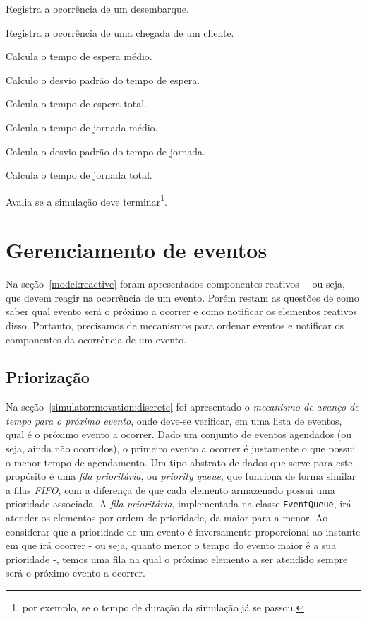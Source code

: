 \begin{description}
    \begin{description}[leftmargin=!,labelwidth=\widthof{\bfseries destinationFloor}]
      \item[\texttt{logDropOff}] Registra a ocorrência de um desembarque.
      \item[\texttt{logTrip}] Registra a ocorrência de uma chegada de um cliente.
      \item[\texttt{getAvgWT}] Calcula o tempo de espera médio.
      \item[\texttt{getDevWt}] Calculo o desvio padrão do tempo de espera.
      \item[\texttt{getTotalWT}] Calcula o tempo de espera total.
      \item[\texttt{getAvgWT}] Calcula o tempo de jornada médio.
      \item[\texttt{getDevWt}] Calcula o desvio padrão do tempo de jornada.
      \item[\texttt{getTotalWT}] Calcula o tempo de jornada total.
      \item[\texttt{keepRunning}] Avalia se a simulação deve terminar\footnote{por exemplo, se o tempo de duração da simulação já se passou.}.
    \end{description}
\end{description}

\section{\label{sec:model:event}Gerenciamento de eventos}

Na seção~\ref{model:reactive} foram apresentados componentes reativos~-~ou seja,
que devem reagir na ocorrência de um evento. Porém restam as questões de como
saber qual evento será o próximo a ocorrer e como notificar os elementos
reativos disso. Portanto, precisamos de mecanismos para ordenar eventos e
notificar os componentes da ocorrência de um evento.

\subsection{Priorização}

Na seção~\ref{simulator:movation:discrete} foi apresentado o \textit{mecanismo
de avanço de tempo para o próximo evento}, onde deve-se verificar, em uma lista
de eventos, qual é o próximo evento a ocorrer. Dado um conjunto de eventos
agendados (ou seja, ainda não ocorridos), o primeiro evento a ocorrer é
justamente o que possui o menor tempo de agendamento. Um tipo abstrato de dados
que serve para este propósito é uma \textit{fila prioritária}, ou
\textit{priority queue}, que funciona de forma similar a filas \textit{FIFO},
com a diferença de que cada elemento armazenado possui uma prioridade associada.
A \textit{fila prioritária}, implementada na classe \texttt{EventQueue}, irá
atender os elementos por ordem de prioridade, da maior para a menor. Ao
considerar que a prioridade de um evento é inversamente proporcional ao instante
em que irá ocorrer - ou seja, quanto menor o tempo do evento maior é a sua
prioridade -, temos uma fila na qual o próximo elemento a ser atendido sempre
será o próximo evento a ocorrer.

